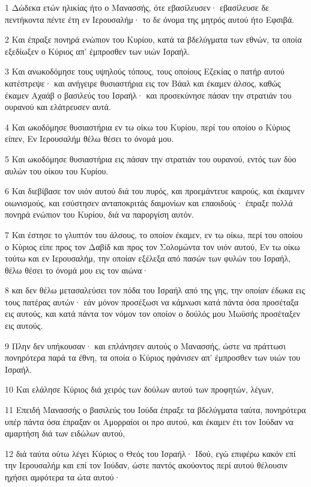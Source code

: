 \par 1 Δώδεκα ετών ηλικίας ήτο ο Μανασσής, ότε εβασίλευσεν· εβασίλευσε δε πεντήκοντα πέντε έτη εν Ιερουσαλήμ· το δε όνομα της μητρός αυτού ήτο Εφσιβά.
\par 2 Και έπραξε πονηρά ενώπιον του Κυρίου, κατά τα βδελύγματα των εθνών, τα οποία εξεδίωξεν ο Κύριος απ' έμπροσθεν των υιών Ισραήλ.
\par 3 Και ανωκοδόμησε τους υψηλούς τόπους, τους οποίους Εζεκίας ο πατήρ αυτού κατέστρεψε· και ανήγειρε θυσιαστήρια εις τον Βάαλ και έκαμεν άλσος, καθώς έκαμεν Αχαάβ ο βασιλεύς του Ισραήλ· και προσεκύνησε πάσαν την στρατιάν του ουρανού και ελάτρευσεν αυτά.
\par 4 Και ωκοδόμησε θυσιαστήρια εν τω οίκω του Κυρίου, περί του οποίου ο Κύριος είπεν, Εν Ιερουσαλήμ θέλω θέσει το όνομά μου.
\par 5 Και ωκοδόμησε θυσιαστήρια εις πάσαν την στρατιάν του ουρανού, εντός των δύο αυλών του οίκου του Κυρίου.
\par 6 Και διεβίβασε τον υιόν αυτού διά του πυρός, και προεμάντευε καιρούς, και έκαμνεν οιωνισμούς, και εσύστησεν ανταποκριτάς δαιμονίων και επαοιδούς· έπραξε πολλά πονηρά ενώπιον του Κυρίου, διά να παροργίση αυτόν.
\par 7 Και έστησε το γλυπτόν του άλσους, το οποίον έκαμεν, εν τω οίκω, περί του οποίου ο Κύριος είπε προς τον Δαβίδ και προς τον Σολομώντα τον υιόν αυτού, Εν τω οίκω τούτω και εν Ιερουσαλήμ, την οποίαν εξέλεξα από πασών των φυλών του Ισραήλ, θέλω θέσει το όνομά μου εις τον αιώνα·
\par 8 και δεν θέλω μετασαλεύσει τον πόδα του Ισραήλ από της γης, την οποίαν έδωκα εις τους πατέρας αυτών· εάν μόνον προσέξωσι να κάμνωσι κατά πάντα όσα προσέταξα εις αυτούς, και κατά πάντα τον νόμον τον οποίον ο δούλός μου Μωϋσής προσέταξεν εις αυτούς.
\par 9 Πλην δεν υπήκουσαν· και επλάνησεν αυτούς ο Μανασσής, ώστε να πράττωσι πονηρότερα παρά τα έθνη, τα οποία ο Κύριος ηφάνισεν απ' έμπροσθεν των υιών του Ισραήλ.
\par 10 Και ελάλησε Κύριος διά χειρός των δούλων αυτού των προφητών, λέγων,
\par 11 Επειδή Μανασσής ο βασιλεύς του Ιούδα έπραξε τα βδελύγματα ταύτα, πονηρότερα υπέρ πάντα όσα έπραξαν οι Αμορραίοι οι προ αυτού, και έκαμεν έτι τον Ιούδαν να αμαρτήση διά των ειδώλων αυτού,
\par 12 διά ταύτα ούτω λέγει Κύριος ο Θεός του Ισραήλ· Ιδού, εγώ επιφέρω κακόν επί την Ιερουσαλήμ και επί τον Ιούδαν, ώστε παντός ακούοντος περί αυτού θέλουσιν ηχήσει αμφότερα τα ώτα αυτού·
